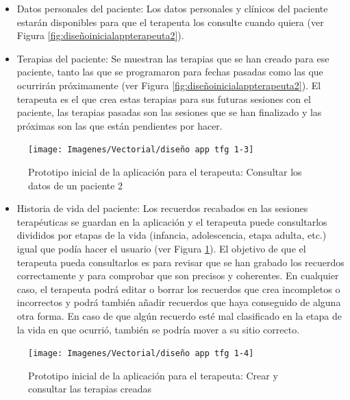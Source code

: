 \begin{itemize}
	\item Datos personales del paciente: Los datos personales y clínicos del paciente estarán disponibles para que el terapeuta los consulte cuando quiera (ver Figura \ref{fig:diseñoinicialappterapeuta2}).
	\item Terapias del paciente: Se muestran las terapias que se han creado para ese paciente, tanto las que se programaron para fechas pasadas como las que ocurrirán próximamente (ver Figura \ref{fig:diseñoinicialappterapeuta2}). El terapeuta es el que crea estas terapias para sus futuras sesiones con el paciente, las terapias pasadas son las sesiones que se han finalizado y las próximas son las que están pendientes por hacer.
\end{itemize}

\begin{figure}[h]
	\centering
	\texttt{[image: Imagenes/Vectorial/diseño app tfg 1-3]}
	\caption{Prototipo inicial de la aplicación para el terapeuta: Consultar los datos de un paciente 2}
	\label{fig:diseñoinicialappterapeuta3}
\end{figure}


\begin{itemize}
	\item Historia de vida del paciente: Los recuerdos recabados en las sesiones terapéuticas se guardan en la aplicación y el terapeuta puede consultarlos divididos por etapas de la vida (infancia, adolescencia, etapa adulta, etc.) igual que podía hacer el usuario (ver Figura \ref{fig:diseñoinicialappterapeuta3}). El objetivo de que el terapeuta pueda consultarlos es para revisar que se han grabado los recuerdos correctamente y para comprobar que son precisos y coherentes. En cualquier caso, el terapeuta podrá editar o borrar los recuerdos que crea incompletos o incorrectos y podrá también añadir recuerdos que haya conseguido de alguna otra forma. En caso de que algún recuerdo esté mal clasificado en la etapa de la vida en que ocurrió, también se podría mover a su sitio correcto.
\end{itemize}

\begin{figure}[h]
	\centering
	\texttt{[image: Imagenes/Vectorial/diseño app tfg 1-4]}
	\caption{Prototipo inicial de la aplicación para el terapeuta: Crear y consultar las terapias creadas}
	\label{fig:diseñoinicialappterapeuta4}
\end{figure}


